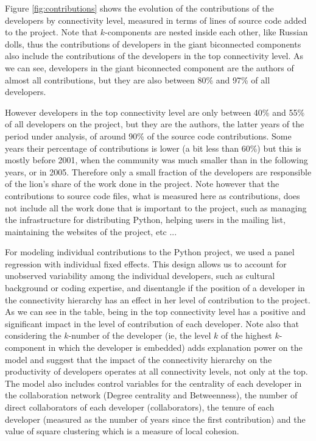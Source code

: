 Figure \ref{fig:contributions} shows the evolution of the contributions of the developers by connectivity level, measured in terms of lines of source code added to the project. Note that $k$-components are nested inside each other, like Russian dolls, thus the contributions of developers in the giant biconnected components also include the contributions of the developers in the top connectivity level. As we can see, developers in the giant biconnected component are the authors of almost all contributions, but they are also between 80\% and 97\% of all developers.

However developers in the top connectivity level are only between 40\% and 55\% of all developers on the project, but they are the authors, the latter years of the period under analysis, of around 90\% of the source code contributions. Some years their percentage of contributions is lower (a bit less than 60\%) but this is mostly before 2001, when the community was much smaller than in the following years, or in 2005. Therefore only a small fraction of the developers are responsible of the lion's share of the work done in the project. Note however that the contributions to source code files, what is measured here as contributions, does not include all the work done that is important to the project, such as managing the infrastructure for distributing Python, helping users in the mailing list, maintaining the websites of the project, etc ... 

For modeling individual contributions to the Python project, we used a panel regression with individual fixed effects. This design allows us to account for unobserved variability among the individual developers, such as cultural background or coding expertise, and disentangle if the position of a developer in the connectivity hierarchy has an effect in her level of contribution to the project. As we can see in the table, being in the top connectivity level has a positive and significant impact in the level of contribution of each developer. Note also that considering the $k$-number of the developer (ie, the level $k$ of the highest $k$-component in which the developer is embedded) adds explanation power on the model and suggest that the impact of the connectivity hierarchy on the productivity of developers operates at all connectivity levels, not only at the top. The model also includes control variables for the centrality of each developer in the collaboration network (Degree centrality and Betweenness), the number of direct collaborators of each developer (collaborators), the tenure of each developer (measured as the number of years since the first contribution) and the value of square clustering which is a measure of local cohesion.

